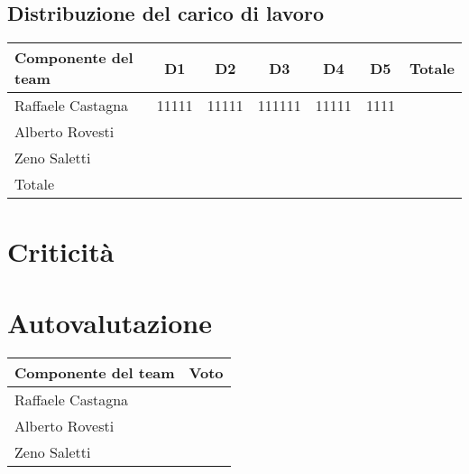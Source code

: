 \documentclass[11pt, a4paper]{article}
\theoremstyle{definition}
\begin{document}
\subsection{Distribuzione del carico di lavoro}
\begin{center}
  \footnotesize
  \begin{tabularx}{\textwidth}{|X||c||c||c||c||c||c|}
      \hline
      \cellcolor{red!70}Componente del team & \cellcolor{red!70}D1 & \cellcolor{red!70}D2 & \cellcolor{red!70}D3 & \cellcolor{red!70}D4 & \cellcolor{red!70}D5 & \cellcolor{red!70}Totale\\
      \hline
      Raffaele Castagna & 11111&11111&111111&11111&1111&\\
      \hline
      Alberto Rovesti & &&&&&\\
      \hline
      Zeno Saletti & &&&&&\\
      \hline
      \cellcolor{red!70}Totale & &&&&&\\
      \hline
  \end{tabularx}
\end{center}

\section{Criticità}
\section{Autovalutazione}
\begin{center}
  \footnotesize
  \begin{tabularx}{\columnwidth}{|X||c|}
      \hline
      \cellcolor{red!70}Componente del team & \cellcolor{red!70}Voto\\
      \hline
      Raffaele Castagna & \\
      \hline
      Alberto Rovesti & \\
      \hline
      Zeno Saletti & \\
      \hline
  \end{tabularx}
\end{center}
\end{document}
